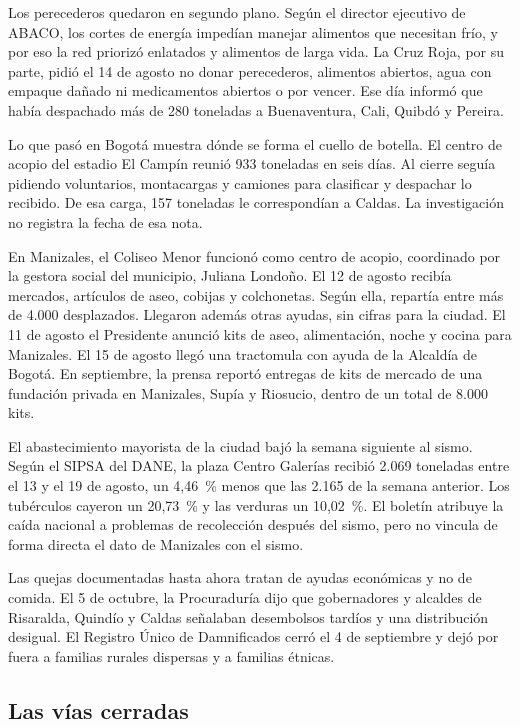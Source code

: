 Los perecederos quedaron en segundo plano. Según el director ejecutivo de ABACO, los cortes de energía impedían manejar alimentos que necesitan frío, y por eso la red priorizó enlatados y alimentos de larga vida. La Cruz Roja, por su parte, pidió el 14 de agosto no donar perecederos, alimentos abiertos, agua con empaque dañado ni medicamentos abiertos o por vencer. Ese día informó que había despachado más de 280 toneladas a Buenaventura, Cali, Quibdó y Pereira.

Lo que pasó en Bogotá muestra dónde se forma el cuello de botella. El centro de acopio del estadio El Campín reunió 933 toneladas en seis días. Al cierre seguía pidiendo voluntarios, montacargas y camiones para clasificar y despachar lo recibido. De esa carga, 157 toneladas le correspondían a Caldas. La investigación no registra la fecha de esa nota.

En Manizales, el Coliseo Menor funcionó como centro de acopio, coordinado por la gestora social del municipio, Juliana Londoño. El 12 de agosto recibía mercados, artículos de aseo, cobijas y colchonetas. Según ella, repartía entre más de 4.000 desplazados. Llegaron además otras ayudas, sin cifras para la ciudad. El 11 de agosto el Presidente anunció kits de aseo, alimentación, noche y cocina para Manizales. El 15 de agosto llegó una tractomula con ayuda de la Alcaldía de Bogotá. En septiembre, la prensa reportó entregas de kits de mercado de una fundación privada en Manizales, Supía y Riosucio, dentro de un total de 8.000 kits.

El abastecimiento mayorista de la ciudad bajó la semana siguiente al sismo. Según el SIPSA del DANE, la plaza Centro Galerías recibió 2.069 toneladas entre el 13 y el 19 de agosto, un 4,46~\% menos que las 2.165 de la semana anterior. Los tubérculos cayeron un 20,73~\% y las verduras un 10,02~\%. El boletín atribuye la caída nacional a problemas de recolección después del sismo, pero no vincula de forma directa el dato de Manizales con el sismo.

Las quejas documentadas hasta ahora tratan de ayudas económicas y no de comida. El 5 de octubre, la Procuraduría dijo que gobernadores y alcaldes de Risaralda, Quindío y Caldas señalaban desembolsos tardíos y una distribución desigual. El Registro Único de Damnificados cerró el 4 de septiembre y dejó por fuera a familias rurales dispersas y a familias étnicas.

\subsection{Las vías cerradas}

